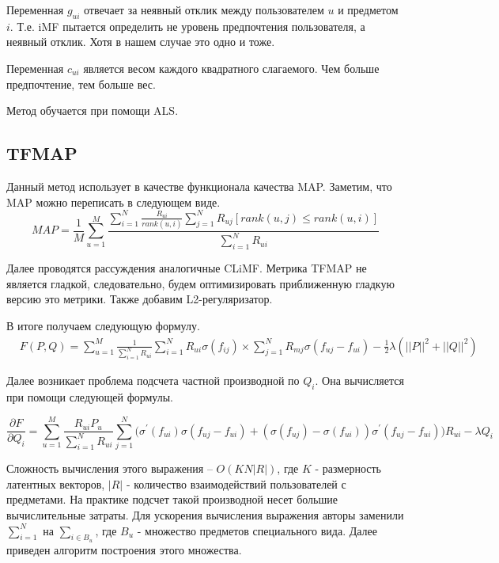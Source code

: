 \documentclass[a4paper,12pt]{article}
\begin{document}
Переменная $g_{ui}$ отвечает за неявный отклик между пользователем $u$ и предметом $i$. Т.е. iMF пытается определить не уровень предпочтения пользователя, а неявный отклик. Хотя в нашем случае это одно и тоже. 

Переменная $c_{ui}$ является весом каждого квадратного слагаемого. Чем больше предпочтение, тем больше вес. 

Метод обучается при помощи ALS.


%

\subsection{TFMAP}
Данный метод использует в качестве функционала качества MAP. Заметим, что MAP можно переписать в следующем виде. 
\begin{equation*}
 MAP = \frac{1}{M}\sum_{u=1}^M\frac{\sum_{i=1}^N \frac{R_{ui}}{rank(u, i)} \sum_{j=1}^N R_{uj} 
 [rank(u,j) \leq rank(u, i)]}{\sum_{i=1}^N R_{ui}} 
\end{equation*} 
 
 Далее проводятся рассуждения аналогичные CLiMF. Метрика TFMAP  не является гладкой, следовательно, будем оптимизировать приближенную гладкую версию это метрики. Также добавим L2-регуляризатор.
 
 В итоге получаем  следующую формулу.
 \begin{equation*}
 \begin{split}
 & F(P, Q) = \sum_{u=1}^M \frac{1}{\sum_{i=1}^N R_{ui}} \sum_{i=1}^N R_{ui} \sigma(f_{ij}) \times \sum_{j=1}^N R_{mj} \sigma(f_{uj} - f_{ui}) - \frac{1}{2}\lambda({||P||}^2 + {||Q||}^2)
 \end{split}
 \end{equation*}

Далее возникает проблема подсчета частной производной по $Q_i$. Она вычисляется при помощи следующей формулы. 

\begin{equation*}
 \frac{\partial F}{\partial Q_i} = \sum_{u=1}^M\frac{R_{ui} P_u}{\sum_{i=1}^N R_{ui}}\sum_{j=1}^N \Big(\sigma^{\prime}( f_{ui})\sigma(f_{uj} - f_{ui}) + (\sigma(f_{uj}) - \sigma(f_{ui}))\sigma^{\prime}(f_{uj} - f_{ui}) \Big )  R_{ui} - \lambda Q_i
\end{equation*}

Сложность вычисления этого выражения -- $O(KN|R|)$, где $K$ - размерность латентных векторов, $|R|$ -  количество взаимодействий пользователей с предметами. На практике подсчет такой производной несет большие вычислительные затраты. Для ускорения вычисления выражения авторы заменили $\sum_{i=1}^N$ на $\sum_{i \in B_{u}}$, где $B_{u}$ - множество предметов специального вида. Далее приведен алгоритм построения этого множества.
\end{document}
